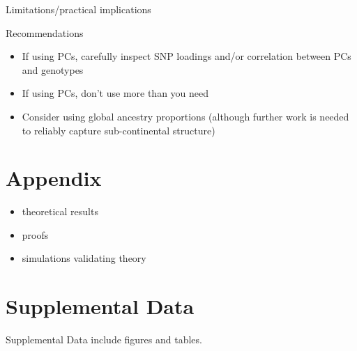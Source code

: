 \documentclass[12pt]{article}
\newcommand{\add}[1]{{\color{red}{[... #1 ...]}}}
\begin{document}
\noindent Limitations/practical implications

\noindent Recommendations
\begin{itemize}
\item If using PCs, carefully inspect SNP loadings and/or correlation between PCs and genotypes
\item If using PCs, don't use more than you need
\item Consider using global ancestry proportions (although further work is needed to reliably capture sub-continental structure)
\end{itemize}





\newpage
\section{Appendix}


\begin{itemize}
\item theoretical results
\item proofs
\item simulations validating theory
\end{itemize}


\newpage
\section*{Supplemental Data}


Supplemental Data include \add{??} figures and \add{??} tables.
\end{document}
